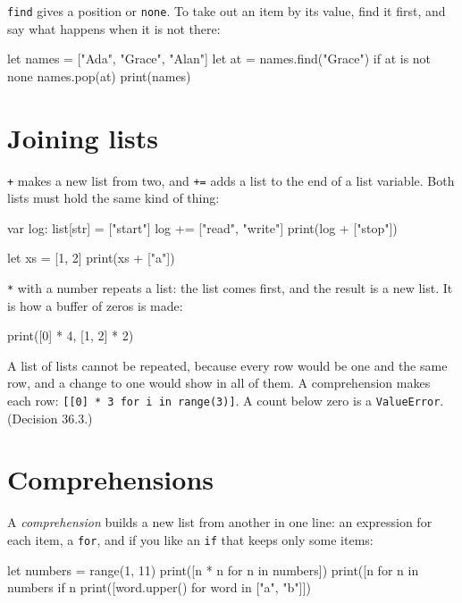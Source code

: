 \verb|find| gives a position or \verb|none|. To take out an item by
its value, find it first, and say what happens when it is not there:

\begin{zeno}
let names = ["Ada", "Grace", "Alan"]
let at = names.find("Grace")
if at is not none {
    names.pop(at)
}
print(names)
\end{zeno}

\section{Joining lists}

\verb|+| makes a new list from two, and \verb|+=| adds a list to the
end of a list variable. Both lists must hold the same kind of thing:

\begin{zeno}
var log: list[str] = ["start"]
log += ["read", "write"]
print(log + ["stop"])
\end{zeno}

\begin{zeno}[fails=yes]
let xs = [1, 2]
print(xs + ["a"])
\end{zeno}

\verb|*| with a number repeats a list: the list comes first, and the
result is a new list. It is how a buffer of zeros is made:

\begin{zeno}
print([0] * 4, [1, 2] * 2)
\end{zeno}

A list of lists cannot be repeated, because every row would be one and
the same row, and a change to one would show in all of them. A
comprehension makes each row: \verb|[[0] * 3 for i in range(3)]|. A
count below zero is a \verb|ValueError|. (Decision 36.3.)

\section{Comprehensions}

A \emph{comprehension} builds a new list from another in one line: an
expression for each item, a \verb|for|, and if you like an \verb|if|
that keeps only some items:

\begin{zeno}
let numbers = range(1, 11)
print([n * n for n in numbers])
print([n for n in numbers if n %
print([word.upper() for word in ["a", "b"]])
\end{zeno}

